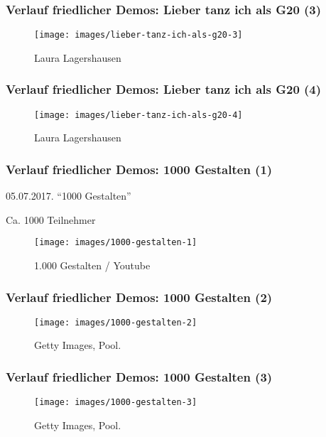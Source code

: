 \documentclass[]{beamer}
\begin{document}
	\begin{frame}
	\frametitle{Verlauf friedlicher Demos: Lieber tanz ich als G20 (3)}
	\begin{figure}
		\renewcommand{\figurename}{Foto} 
		\texttt{[image: images/lieber-tanz-ich-als-g20-3]}
		\caption{Laura Lagershausen }
	\end{figure}
\end{frame}

	\begin{frame}
	\frametitle{Verlauf friedlicher Demos: Lieber tanz ich als G20 (4)}
	\begin{figure}
		\renewcommand{\figurename}{Foto} 
		\texttt{[image: images/lieber-tanz-ich-als-g20-4]}
		\caption{Laura Lagershausen }
	\end{figure}
\end{frame}

	\begin{frame}
	\frametitle{Verlauf friedlicher Demos: 1000 Gestalten (1)}
		05.07.2017. \enquote{1000 Gestalten}\par
		Ca. 1000 Teilnehmer
	\begin{figure}
		\renewcommand{\figurename}{Foto} 
		\texttt{[image: images/1000-gestalten-1]}
		\caption{1.000 Gestalten / Youtube}
	\end{figure}
\end{frame}

	\begin{frame}
	\frametitle{Verlauf friedlicher Demos: 1000 Gestalten (2)}
	\begin{figure}
		\renewcommand{\figurename}{Foto} 
		\texttt{[image: images/1000-gestalten-2]}
		\caption{Getty Images, Pool.}
	\end{figure}
\end{frame}

	\begin{frame}
	\frametitle{Verlauf friedlicher Demos: 1000 Gestalten (3)}
	\begin{figure}
		\renewcommand{\figurename}{Foto} 
		\texttt{[image: images/1000-gestalten-3]}
		\caption{Getty Images, Pool.}
	\end{figure}
\end{frame}
\end{document}
